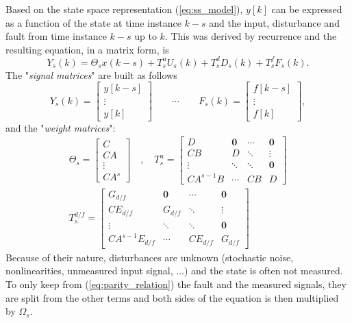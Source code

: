 \documentclass[conference]{IEEEtran}
\begin{document}
Based on the state space representation (\ref{eq:ss_model}), $y[k]$ can be expressed as a function of the state at time instance $k-s$ and the input, disturbance and fault from time instance $k-s$ up to $k$. This was derived by recurrence and the resulting equation, in a matrix form, is
\begin{equation}
    Y_s(k) = \Theta_s x(k-s) + T_s^u U_s(k) + T_s^d D_s(k) + T_s^f F_s(k).
    \label{eq:parity_relation}
\end{equation}
The "\textit{signal matrices}" are built as follows
\begin{equation}
    Y_s(k) = \begin{bmatrix}
        y[k-s] \\ \vdots \\ y[k]
    \end{bmatrix}
    \qquad \cdots \qquad
    F_s(k) = \begin{bmatrix}
        f[k-s] \\ \vdots \\ f[k]
    \end{bmatrix},
\end{equation}
and the "\textit{weight matrices}":
\begin{equation}
    \begin{gathered}
        \Theta_s = \begin{bmatrix}
            C \\ C A \\ \vdots \\ C A^s
        \end{bmatrix}
        \quad , \quad
        T_s^u = \begin{bmatrix}
            D & \mathbf{0} & \cdots & \mathbf{0} \\
            C B & D & \ddots & \vdots \\
            \vdots & \ddots & \ddots & \mathbf{0} \\
            C A^{s-1} B & \cdots & C B & D
        \end{bmatrix} \\
        T_s^{d/f} = \begin{bmatrix}
            G_{d/f} & \mathbf{0} & \cdots & \mathbf{0} \\
            C E_{d/f} & G_{d/f} & \ddots & \vdots \\
            \vdots & \ddots & \ddots & \mathbf{0} \\
            C A^{s-1} E_{d/f} & \cdots & C E_{d/f} & G_{d/f}
        \end{bmatrix}
    \end{gathered}
\end{equation}
Because of their nature, disturbances are unknown (stochastic noise, nonlinearities, unmeasured input signal, ...) and the state is often not measured. To only keep from (\ref{eq:parity_relation}) the fault and the measured signals, they are split from the other terms and both sides of the equation is then multiplied by $\Omega_s$. 
\end{document}
